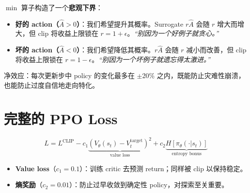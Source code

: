 \begin{intuitionbox}
$\min$ 算子构造了一个\textbf{悲观下界}：

\begin{itemize}
  \item \textbf{好的 action（$\hat{A} > 0$）}：我们希望提升其概率。Surrogate $r\hat{A}$ 会随 $r$ 增大而增大，但 clip 将收益上限锁在 $r = 1 + \epsilon$。\emph{“别因为一个好例子就贪心。”}
  \item \textbf{坏的 action（$\hat{A} < 0$）}：我们希望降低其概率。$r\hat{A}$ 会随 $r$ 减小而改善，但 clip 将收益上限锁在 $r = 1 - \epsilon$。\emph{“别因为一个坏例子就遗忘得太激进。”}
\end{itemize}

净效应：每次更新步中 policy 的变化最多在 $\pm$20\% 之内，既能防止灾难性崩溃，也能防止过度自信地走向特化。
\end{intuitionbox}

\section{完整的 PPO Loss}
\label{full-ppo-loss}

\begin{equation}
L = L^{\text{CLIP}} - c_1 \underbrace{(V_\theta(s_t) - V^{\text{target}}_t)^2}_{\text{value loss}} + c_2 \underbrace{H[\pi_\theta(\cdot|s_t)]}_{\text{entropy bonus}}
\end{equation}

\begin{itemize}
  \item \textbf{Value loss}（$c_1 = 0.1$）：训练 critic 去预测 return；同样被 clip 以保持稳定。
  \item \textbf{熵奖励}（$c_2 = 0.01$）：防止过早收敛到确定性 policy，对探索至关重要。
\end{itemize}


